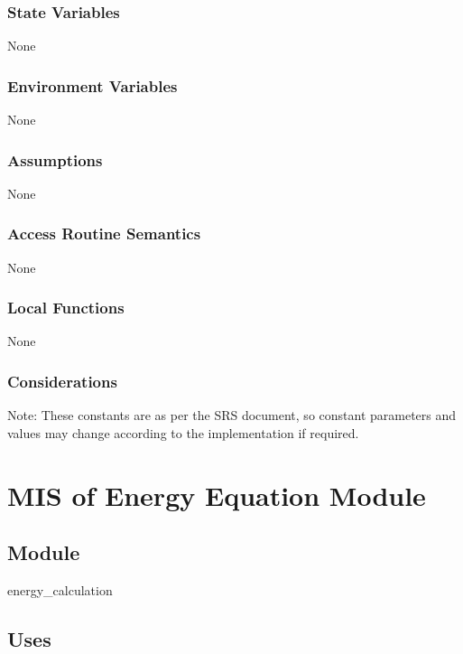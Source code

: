 \documentclass[12pt, titlepage]{article}
\begin{document}
\subsubsection{State Variables}

None


\subsubsection{Environment Variables}

None

\subsubsection{Assumptions}

None

\subsubsection{Access Routine Semantics}

None

\subsubsection{Local Functions}

None

\subsubsection{Considerations}
Note: These constants are as per the SRS document, so constant parameters and values may change according to the implementation if required.  

\newpage

\section{MIS of Energy Equation Module} \label{Energy_Equation_Module} 

\subsection{Module}

energy\_calculation

\subsection{Uses}
\end{document}
